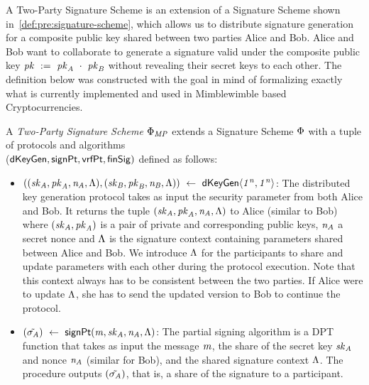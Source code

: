 A Two-Party Signature Scheme is an extension of a Signature Scheme shown in~\cref{def:pre:signature-scheme}, which allows us to distribute signature generation for a composite public key shared between two parties Alice and Bob.
Alice and Bob want to collaborate to generate a signature valid under the composite public key $\mathit{pk} ~:=~ \mathit{pk}_{\mathit{A}} ~\cdot~ \mathit{pk}_{\mathit{B}}$ without revealing their secret keys to each other.
The definition below was constructed with the goal in mind of formalizing exactly what is currently implemented and used in Mimblewimble based Cryptocurrencies.

\begin{definition}
    \label{def:sig:two-party-sig}

    A \emph{Two-Party Signature Scheme $\Phi_{\mathit{MP}}$} extends a Signature Scheme $\Phi$ with a tuple of protocols and algorithms\\
    ($\mathsf{dKeyGen}, \mathsf{signPt} , \mathsf{vrfPt}, \mathsf{finSig})$ defined as follows:

    \begin{itemize}
        \item $((\mathit{sk}_{\mathit{A}}, \mathit{pk}_{\mathit{A}}, \mathit{\mathit{n}_{\mathit{A}}}, \Lambda), (\mathit{sk}_{\mathit{B}}, \mathit{pk}_{\mathit{B}}, \mathit{\mathit{n}_{\mathit{B}}}, \Lambda)) ~\leftarrow~ \mathsf{dKeyGen}\langle \mathit{1^n}, \mathit{1^n} \rangle$: The distributed key generation protocol takes as input the security parameter from both Alice and Bob.
        It returns the tuple $(\mathit{sk}_{\mathit{A}}, \mathit{pk}_{\mathit{A}}, \mathit{\mathit{n}_{\mathit{A}}}, \Lambda)$ to Alice (similar to Bob) where $(\mathit{sk}_{\mathit{A}}, \mathit{pk}_{\mathit{A}})$ is a pair of private and corresponding public keys, $\mathit{\mathit{n}_{\mathit{A}}}$ a secret nonce and $\Lambda$ is the signature context containing parameters shared between Alice and Bob.
        We introduce $\Lambda$ for the participants to share and update parameters with each other during the protocol execution.
        Note that this context always has to be consistent between the two parties.
        If Alice were to update $\Lambda$, she has to send the updated version to Bob to continue the protocol.

        \item $(\tilde{\sigma_{\mathit{A}}}) ~\leftarrow~ \mathsf{signPt}(\mathit{m}, \mathit{sk}_{\mathit{A}}, \mathit{\mathit{n}_{\mathit{A}}}, \Lambda)$: The partial signing algorithm is a DPT function that takes as input the message $\mathit{m}$, the share of the secret key $\mathit{sk}_{\mathit{A}}$ and nonce $\mathit{\mathit{n}_{\mathit{A}}}$ (similar for Bob), and the shared signature context $\Lambda$. The procedure outputs $(\tilde{\sigma_{\mathit{A}}})$, that is, a share of the signature to a participant.


\end{itemize}
\end{definition}

